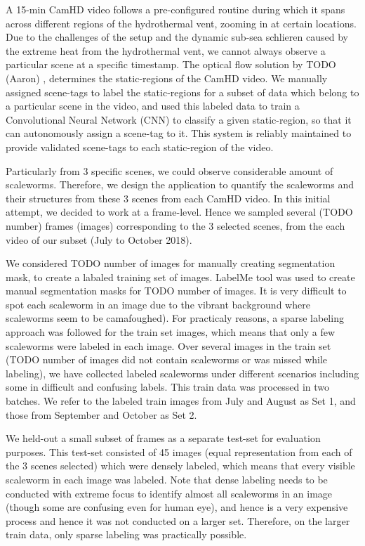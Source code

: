 \documentclass[10pt,twocolumn,letterpaper]{article}
\begin{document}
A 15-min CamHD video follows a pre-configured routine during which it spans across different regions of the hydrothermal vent, zooming in at certain locations. Due to the challenges of the setup and the dynamic sub-sea schlieren caused by the extreme heat from the hydrothermal vent, we cannot always observe a particular scene at a specific timestamp. The optical flow solution by TODO (Aaron) \etal \cite{aaron_prevwork}, determines the static-regions of the CamHD video. We manually assigned scene-tags to label the static-regions for a subset of data which belong to a particular scene in the video, and used this labeled data to train a Convolutional Neural Network (CNN) to classify a given static-region, so that it can autonomously assign a scene-tag to it. This system is reliably maintained to provide validated scene-tags to each static-region of the video.

Particularly from 3 specific scenes, we could observe considerable amount of scaleworms. Therefore, we design the application to quantify the scaleworms and their structures from these 3 scenes from each CamHD video. In this initial attempt, we decided to work at a frame-level. Hence we sampled several (TODO number) frames (images) corresponding to the 3 selected scenes, from the each video of our subset (July to October 2018).

We considered TODO number of images for manually creating segmentation mask, to create a labaled training set of images. LabelMe tool \cite{labelme} was used to create manual segmentation masks for TODO number of images. It is very difficult to spot each scaleworm in an image due to the vibrant background where scaleworms seem to be camafoughed). For practicaly reasons, a sparse labeling approach was followed for the train set images, which means that only a few scaleworms were labeled in each image. Over several images in the train set (TODO number of images did not contain scaleworms or was missed while labeling), we have collected labeled scaleworms under different scenarios including some in difficult and confusing labels. This train data was processed in two batches. We refer to the labeled train images from July and August as Set 1, and those from September and October as Set 2.

We held-out a small subset of frames as a separate test-set for evaluation purposes. This test-set consisted of 45 images (equal representation from each of the 3 scenes selected) which were densely labeled, which means that every visible scaleworm in each image was labeled. Note that dense labeling needs to be conducted with extreme focus to identify almost all scaleworms in an image (though some are confusing even for human eye), and hence is a very expensive process and hence it was not conducted on a larger set. Therefore, on the larger train data, only sparse labeling was practically possible.
\end{document}
